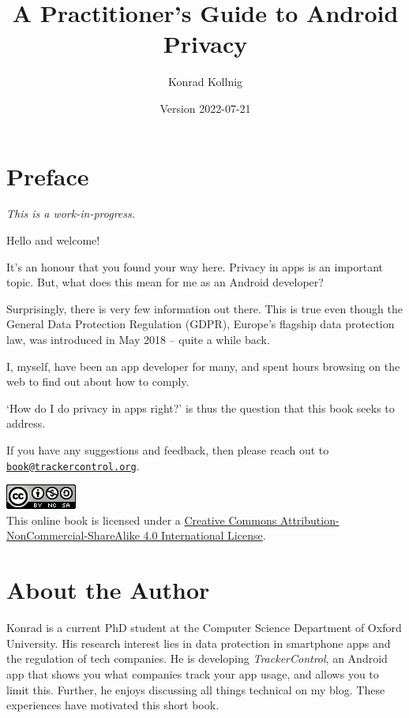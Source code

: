 \documentclass[
]{book}
\title{A Practitioner's Guide to Android Privacy}
\author{Konrad Kollnig}
\date{Version 2022-07-21}
\begin{document}
\maketitle

{
\setcounter{tocdepth}{1}
\tableofcontents
}
\hypertarget{preface}{%
\chapter*{Preface}\label{preface}}

\emph{This is a work-in-progress.}

Hello and welcome!

It's an honour that you found your way here. Privacy in apps is an important topic. But, what does this mean for me as an Android developer?

Surprisingly, there is very few information out there. This is true even though the General Data Protection Regulation (GDPR), Europe's flagship data protection law, was introduced in May 2018 -- quite a while back.

I, myself, have been an app developer for many, and spent hours browsing on the web to find out about how to comply.

`How do I do privacy in apps right?' is thus the question that this book seeks to address.

If you have any suggestions and feedback, then please reach out to \href{mailto:book@trackercontrol.org}{\nolinkurl{book@trackercontrol.org}}.

\includegraphics{images/by-nc-sa.png}\\
This online book is licensed under a \href{http://creativecommons.org/licenses/by-nc-sa/4.0/}{Creative Commons Attribution-NonCommercial-ShareAlike 4.0 International License}.

\hypertarget{about-the-author}{%
\chapter*{About the Author}\label{about-the-author}}

Konrad is a current PhD student at the Computer Science Department of Oxford University. His research interest lies in data protection in smartphone apps and the regulation of tech companies. He is developing \emph{TrackerControl}, an Android app that shows you what companies track your app usage, and allows you to limit this. Further, he enjoys discussing all things technical on my blog. These experiences have motivated this short book.
\end{document}
